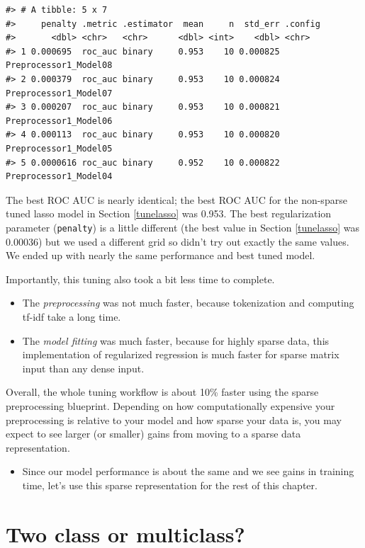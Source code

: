 \documentclass[
]{krantz}
\newenvironment{rmdblock}[1]
  {\begin{shaded*}
  \begin{itemize}[left = -1cm, labelsep = 1cm]
  \renewcommand{\labelitemi}{
    \raisebox{-.7\height}[0pt][0pt]{
      {\setkeys{Gin}{width=3em,keepaspectratio}\texttt{[image: images/\#1]}}
    }
  }
 
  \item
  }
  {
  \end{itemize}
  \end{shaded*}
  }
\newenvironment{rmdnote}
  {\begin{rmdblock}{note}}
  {\end{rmdblock}}
\begin{document}
\begin{verbatim}
#> # A tibble: 5 x 7
#>     penalty .metric .estimator  mean     n  std_err .config              
#>       <dbl> <chr>   <chr>      <dbl> <int>    <dbl> <chr>                
#> 1 0.000695  roc_auc binary     0.953    10 0.000825 Preprocessor1_Model08
#> 2 0.000379  roc_auc binary     0.953    10 0.000824 Preprocessor1_Model07
#> 3 0.000207  roc_auc binary     0.953    10 0.000821 Preprocessor1_Model06
#> 4 0.000113  roc_auc binary     0.953    10 0.000820 Preprocessor1_Model05
#> 5 0.0000616 roc_auc binary     0.952    10 0.000822 Preprocessor1_Model04
\end{verbatim}

The best ROC AUC is nearly identical; the best ROC AUC for the non-sparse tuned lasso model in Section \ref{tunelasso} was 0.953. The best regularization parameter (\texttt{penalty}) is a little different (the best value in Section \ref{tunelasso} was 0.00036) but we used a different grid so didn't try out exactly the same values. We ended up with nearly the same performance and best tuned model.

Importantly, this tuning also took a bit less time to complete.

\begin{itemize}
\item
  The \emph{preprocessing} was not much faster, because tokenization and computing tf-idf take a long time.
\item
  The \emph{model fitting} was much faster, because for highly sparse data, this implementation of regularized regression is much faster for sparse matrix input than any dense input.
\end{itemize}

Overall, the whole tuning workflow is about 10\% faster using the sparse preprocessing blueprint. Depending on how computationally expensive your preprocessing is relative to your model and how sparse your data is, you may expect to see larger (or smaller) gains from moving to a sparse data representation.

\begin{rmdnote}
Since our model performance is about the same and we see gains in
training time, let's use this sparse representation for the rest of this
chapter.
\end{rmdnote}

\hypertarget{mlmulticlass}{%
\section{Two class or multiclass?}\label{mlmulticlass}}
\end{document}
